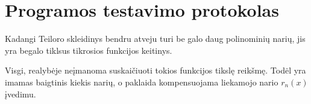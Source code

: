\section{Programos testavimo protokolas}

Kadangi Teiloro skleidinys bendru atveju turi be galo daug polinominių narių, jis yra begalo tiklsus tikrosios funkcijos keitinys.

Visgi, realybėje neįmanoma suskaičiuoti tokios funkcijos tikslę reikšmę.
Todėl yra imamas baigtinis kiekis narių, o paklaida kompensuojama liekamojo nario $r_n(x)$ įvedimu.
